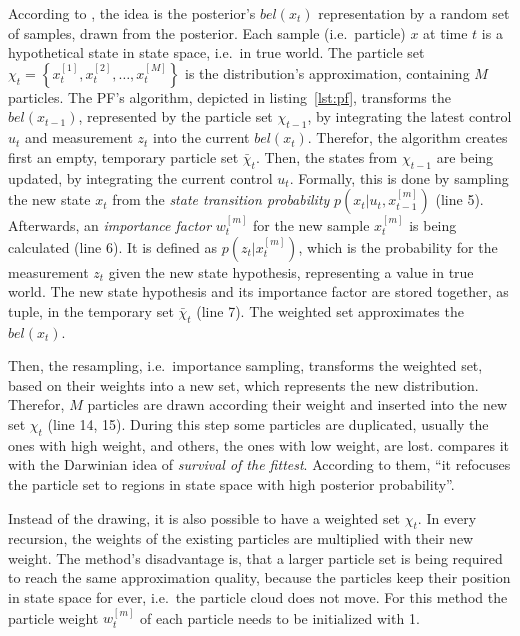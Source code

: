 According to \citet{thrun:prob_robo}, the idea is the posterior's $bel(x_t)$ representation by a random set of samples, drawn from the posterior. Each sample (i.e.\ particle) $x$ at time $t$ is a hypothetical state in state space, i.e.\ in true world. The particle set $\chi_t = \left\{ x^{[1]}_t, x^{[2]}_t, \ldots, x^{[M]}_t \right\}$ is the distribution's approximation, containing $M$ particles. The \ac{PF}'s algorithm, depicted in listing~\ref{lst:pf}, transforms the $bel(x_{t-1})$, represented by the particle set $\chi_{t-1}$, by integrating the latest control $u_t$ and measurement $z_t$ into the current $bel(x_t)$. Therefor, the algorithm creates first an empty, temporary particle set $\bar{\chi}_t$. Then, the states from $\chi_{t-1}$ are being updated, by integrating the current control $u_t$. Formally, this is done by sampling the new state $x_t$ from the \emph{state transition probability} $p(x_t|u_t, x^{[m]}_{t-1})$ (line 5). Afterwards, an \emph{importance factor} $w^{[m]}_t$ for the new sample $x^{[m]}_t$ is being calculated (line 6). It is defined as $p(z_t|x^{[m]}_t)$, which is the probability for the measurement $z_t$ given the new state hypothesis, representing a value in true world. The new state hypothesis and its importance factor are stored together, as tuple, in the temporary set $\bar{\chi}_t$ (line 7). The weighted set approximates the $bel(x_t)$.

Then, the resampling, i.e.\ importance sampling, transforms the weighted set, based on their weights into a new set, which represents the new distribution. Therefor, $M$ particles are drawn according their weight and inserted into the new set $\chi_t$ (line 14, 15). During this step some particles are duplicated, usually the ones with high weight, and others, the ones with low weight, are lost. \citet{thrun:prob_robo} compares it with the Darwinian idea of \emph{survival of the fittest}. According to them, ``it refocuses the particle set to regions in state space with high posterior probability''.
 
Instead of the drawing, it is also possible to have a weighted set $\chi_t$. In every recursion, the weights of the existing particles are multiplied with their new weight. The method's disadvantage is, that a larger particle set is being required to reach the same approximation quality, because the particles keep their position in state space for ever, i.e.\ the particle cloud does not move. For this method the particle weight $w^{[m]}_t$ of each particle needs to be initialized with 1.
 
